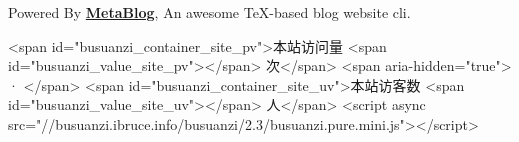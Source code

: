 Powered By \href{https://github.com/MetaronWang/MetaBlog}{\textbf{MetaBlog}}, An awesome TeX-based blog website cli.
\\
\begin{html}
<span id="busuanzi_container_site_pv">本站访问量 <span id="busuanzi_value_site_pv"></span> 次</span>
<span aria-hidden="true"> · </span>
<span id="busuanzi_container_site_uv">本站访客数 <span id="busuanzi_value_site_uv"></span> 人</span>
<script async src="//busuanzi.ibruce.info/busuanzi/2.3/busuanzi.pure.mini.js"></script>
\end{html}
